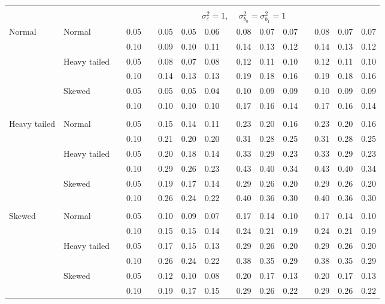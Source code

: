 \documentclass[11pt]{article} %
\begin{document}
\begin{table}[ht]
\begin{scriptsize}
\begin{center}
\begin{tabular}{ll p{.1cm} c p{.1cm} rrr p{.1cm} rrr p{.1cm} rrr}
&&&&&&&&&&&&&&&\\
& && && \multicolumn{9}{c}{$\sigma_{\varepsilon}^2 = 1$, \ \ $\sigma_{b_0}^2 = \sigma_{b_1}^2 = 1$} \\ \cline{6-16}
Normal       & Normal       && 0.05 &&  0.05 & 0.05 & 0.06 && 0.08 & 0.07 & 0.07 && 0.08 & 0.07 & 0.07 \\ 
             &              && 0.10 &&  0.09 & 0.10 & 0.11 && 0.14 & 0.13 & 0.12 && 0.14 & 0.13 & 0.12 \\ 
             & Heavy tailed && 0.05 &&  0.08 & 0.07 & 0.08 && 0.12 & 0.11 & 0.10 && 0.12 & 0.11 & 0.10 \\ 
             &              && 0.10 &&  0.14 & 0.13 & 0.13 && 0.19 & 0.18 & 0.16 && 0.19 & 0.18 & 0.16 \\ 
             & Skewed       && 0.05 &&  0.05 & 0.05 & 0.04 && 0.10 & 0.09 & 0.09 && 0.10 & 0.09 & 0.09 \\ 
             &              && 0.10 &&  0.10 & 0.10 & 0.10 && 0.17 & 0.16 & 0.14 && 0.17 & 0.16 & 0.14 \\ 
             &&&&&&&&&&&&&&&\\
Heavy tailed & Normal       && 0.05 &&  0.15 & 0.14 & 0.11 && 0.23 & 0.20 & 0.16 && 0.23 & 0.20 & 0.16 \\ 
             &              && 0.10 &&  0.21 & 0.20 & 0.20 && 0.31 & 0.28 & 0.25 && 0.31 & 0.28 & 0.25 \\ 
             & Heavy tailed && 0.05 &&  0.20 & 0.18 & 0.14 && 0.33 & 0.29 & 0.23 && 0.33 & 0.29 & 0.23 \\ 
             &              && 0.10 &&  0.29 & 0.26 & 0.23 && 0.43 & 0.40 & 0.34 && 0.43 & 0.40 & 0.34 \\ 
             & Skewed       && 0.05 &&  0.19 & 0.17 & 0.14 && 0.29 & 0.26 & 0.20 && 0.29 & 0.26 & 0.20 \\ 
             &              && 0.10 &&  0.26 & 0.24 & 0.22 && 0.40 & 0.36 & 0.30 && 0.40 & 0.36 & 0.30 \\ 
             &&&&&&&&&&&&&&&\\
Skewed       & Normal       && 0.05 &&  0.10 & 0.09 & 0.07 && 0.17 & 0.14 & 0.10 && 0.17 & 0.14 & 0.10 \\ 
             &              && 0.10 &&  0.15 & 0.15 & 0.14 && 0.24 & 0.21 & 0.19 && 0.24 & 0.21 & 0.19 \\ 
             & Heavy tailed && 0.05 &&  0.17 & 0.15 & 0.13 && 0.29 & 0.26 & 0.20 && 0.29 & 0.26 & 0.20 \\ 
             &              && 0.10 &&  0.26 & 0.24 & 0.22 && 0.38 & 0.35 & 0.29 && 0.38 & 0.35 & 0.29 \\ 
             & Skewed       && 0.05 &&  0.12 & 0.10 & 0.08 && 0.20 & 0.17 & 0.13 && 0.20 & 0.17 & 0.13 \\ 
             &              && 0.10 &&  0.19 & 0.17 & 0.15 && 0.29 & 0.26 & 0.22 && 0.29 & 0.26 & 0.22 \\ 



\end{tabular}
\end{center}
\end{scriptsize}
\end{table}
\end{document}
